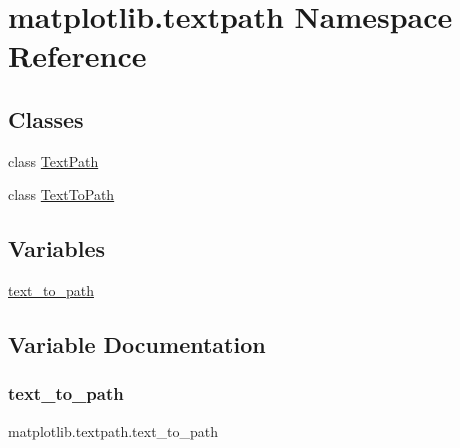 \hypertarget{namespacematplotlib_1_1textpath}{}\section{matplotlib.\+textpath Namespace Reference}
\label{namespacematplotlib_1_1textpath}
\subsection*{Classes}
\begin{DoxyCompactItemize}
\item 
class \hyperlink{classmatplotlib_1_1textpath_1_1TextPath}{Text\+Path}
\item 
class \hyperlink{classmatplotlib_1_1textpath_1_1TextToPath}{Text\+To\+Path}
\end{DoxyCompactItemize}
\subsection*{Variables}
\begin{DoxyCompactItemize}
\item 
\hyperlink{namespacematplotlib_1_1textpath_af8bcbe4b3ab25f93f71b95f17d659bb7}{text\+\_\+to\+\_\+path}
\end{DoxyCompactItemize}


\subsection{Variable Documentation}
\mbox{\label{namespacematplotlib_1_1textpath_af8bcbe4b3ab25f93f71b95f17d659bb7}} 
\subsubsection{\texorpdfstring{text\+\_\+to\+\_\+path}{text\_to\_path}}
{\footnotesize\ttfamily matplotlib.\+textpath.\+text\+\_\+to\+\_\+path}

